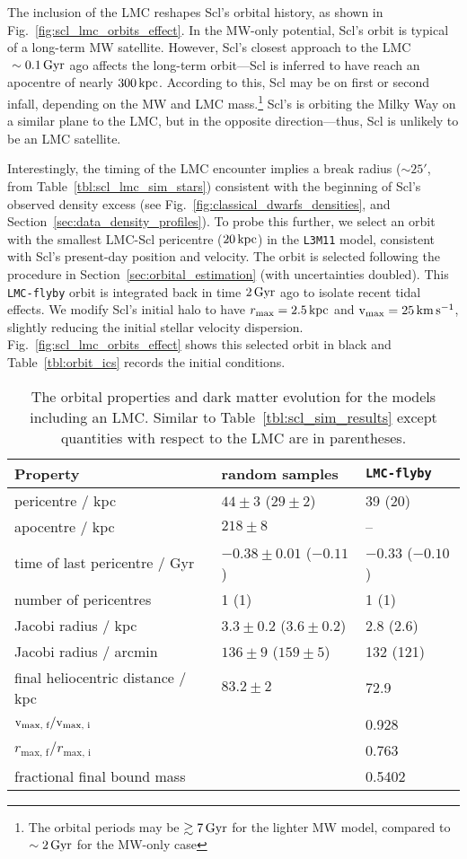 The inclusion of the LMC reshapes Scl's orbital history, as shown in
Fig.~\ref{fig:scl_lmc_orbits_effect}. In the MW-only potential, Scl's
orbit is typical of a long-term MW satellite. However, Scl's closest
approach to the LMC \(~\sim0.1\,{\rm Gyr}\) ago affects the long-term
orbit---Scl is inferred to have reach an apocentre of nearly
\(300\,{\rm kpc}\). According to this, Scl may be on first or second infall,
depending on the MW and LMC mass.\footnote{The orbital periods may be
  \(\gtrsim 7\,{\rm Gyr}\) for the lighter MW model, compared to
  \(\sim 2\,{\rm Gyr}\) for the MW-only case} Scl's is orbiting the Milky Way
on a similar plane to the LMC, but in the opposite direction---thus, Scl
is unlikely to be an LMC satellite.

Interestingly, the timing of the LMC encounter implies a break radius
(\(\sim 25'\), from Table~\ref{tbl:scl_lmc_sim_stars}) consistent with
the beginning of Scl's observed density excess (see
Fig.~\ref{fig:classical_dwarfs_densities}, and
Section~\ref{sec:data_density_profiles}). To probe this further, we
select an orbit with the smallest LMC-Scl pericentre (\(20\,{\rm kpc}\)) in
the \texttt{L3M11} model, consistent with Scl's present-day position and
velocity. The orbit is selected following the procedure in
Section~\ref{sec:orbital_estimation} (with uncertainties doubled). This
\texttt{LMC-flyby} orbit is integrated back in time \(2\,{\rm Gyr}\) ago to
isolate recent tidal effects. We modify Scl's initial halo to have
\(r_{\rm max} = 2.5\,{\rm kpc}\) and \({\rm v}_{\rm max} = 25\,{\rm km\,s^{-1}}\), slightly reducing the
initial stellar velocity dispersion.
Fig.~\ref{fig:scl_lmc_orbits_effect} shows this selected orbit in black
and Table~\ref{tbl:orbit_ics} records the initial conditions.

\begin{table*}[t]
\centering
\caption[Orbits and results for Sculptor in the MW+LMC potential.]{The orbital properties and dark matter evolution for the models including an LMC. Similar to Table \ref{tbl:scl_sim_results} except quantities with respect to the LMC are in parentheses. }
\label{tbl:scl_lmc_sims}
\begin{tabular}{lll}
\toprule
Property & random samples & \texttt{LMC-flyby}\\
\midrule
pericentre $/$ kpc & $44\pm 3$ ($29 \pm 2$) & 39 (20)\\
apocentre $/$ kpc & $218 \pm 8$ & –\\
time of last pericentre $/$ Gyr & $-0.38\pm0.01$ ($-0.11$) & $-0.33$ ($-0.10$)\\
number of pericentres & 1 (1) & 1 (1)\\
Jacobi radius $/$ kpc & $3.3\pm0.2$ ($3.6\pm0.2$) & 2.8 (2.6)\\
Jacobi radius $/$ arcmin & $136 \pm 9$ ($159\pm5$) & 132 (121)\\
final heliocentric distance $/$ kpc & $83.2\pm2$ & 72.9\\
${\rm v}_\textrm{max, f} / {\rm v}_\textrm{max, i}$ &  & 0.928\\
$r_\textrm{max, f} / r_\textrm{max, i}$ &  & 0.763\\
fractional final bound mass &  & 0.5402\\
\bottomrule
\end{tabular}
\end{table*}

